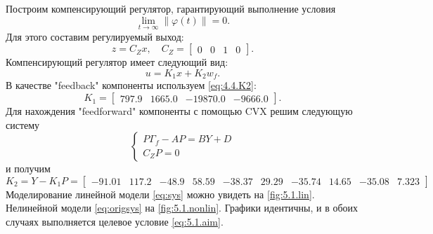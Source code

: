 Построим компенсирующий регулятор, гарантирующий выполнение условия
\begin{equation}
    \label{eq:5.1.aim}
    \lim_{t \to \infty} \| \varphi(t) \| = 0.
\end{equation}
Для этого составим регулируемый выход:
\begin{equation*}
    z=C_Zx,\quad C_Z=\begin{bmatrix}
        0 & 0 & 1 & 0
    \end{bmatrix}.
\end{equation*}
Компенсирующий регулятор имеет следующий вид:
\begin{equation}
    \label{eq:5.1.reg}
    u=K_1x+K_2w_f.
\end{equation}
В качестве "feedback" компоненты используем \eqref{eq:4.4.K2}:
\begin{equation*}
    K_1=\begin{bmatrix}
        797.9 & 1665.0 & -19870.0 & -9666.0
    \end{bmatrix}.
\end{equation*}
Для нахождения "feedforward" компоненты с помощью CVX решим следующую систему
\begin{equation*}
    \begin{cases}
        P\Gamma_f-AP=BY+D\\
        C_ZP=0
    \end{cases}
\end{equation*}
и получим
\begin{equation*}
    K_2=Y-K_1P=\begin{bmatrix}
-91.01 & 117.2 & -48.9 & 58.59 & -38.37 & 29.29 & -35.74 & 14.65 & -35.08 & 7.323
    \end{bmatrix}
\end{equation*}
Моделирование линейной модели \eqref{eq:sys} можно увидеть на 
\autoref{fig:5.1.lin}. Нелинейной модели \eqref{eq:origsys} на
\autoref{fig:5.1.nonlin}. Графики идентичны, и в обоих случаях
выполняется целевое условие \eqref{eq:5.1.aim}.

